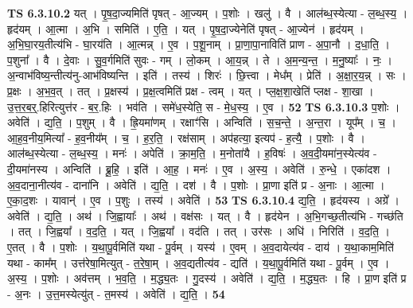 \documentclass[17pt]{extarticle}
\begin{document}
                  \newline
                                \textbf{ TS 6.3.10.2} \newline
                  यत् । पृ॒ष॒दा॒ज्यमिति॑ पृषत् - आ॒ज्यम् । प॒शोः । खलु॑ । वै । आल॑ब्ध॒स्येत्या - ल॒ब्ध॒स्य॒ । हृद॑यम् । आ॒त्मा । अ॒भि । समिति॑ । ए॒ति॒ । यत् । पृ॒ष॒दा॒ज्येनेति॑ पृषत् - आ॒ज्येन॑ । हृद॑यम् । अ॒भि॒घा॒रय॒तीत्य॑भि - घा॒रय॑ति । आ॒त्मन्न् । ए॒व । प॒शू॒नाम् । प्रा॒णा॒पा॒नाविति॑ प्राण - अ॒पा॒नौ । द॒धा॒ति॒ । प॒शुना᳚ । वै । दे॒वाः । सु॒व॒र्गमिति॑ सुवः - गम् । लो॒कम् । आ॒य॒न्न् । ते । अ॒म॒न्य॒न्त॒ । म॒नु॒ष्याः᳚ । नः॒ । अ॒न्वाभ॑विष्य॒न्तीत्य॑नु-आभ॑विष्यन्ति । इति॑ । तस्य॑ । शिरः॑ । छि॒त्त्वा । मेध᳚म् । प्रेति॑ । अ॒क्षा॒र॒य॒न्न् । सः । प्र॒क्षः । अ॒भ॒व॒त् । तत् । प्र॒क्षस्य॑ । प्र॒क्ष॒त्वमिति॑ प्रक्ष - त्वम् । यत् । प्ल॒क्ष॒शा॒खेति॑ प्लक्ष - शा॒खा । उ॒त्त॒र॒ब॒र्॒.हिरित्युत्त॑र - ब॒र॒.हिः । भव॑ति । समे॑ध॒स्येति॒ स - मे॒ध॒स्य॒ । ए॒व । \textbf{  52} \newline
                  \newline
                                \textbf{ TS 6.3.10.3} \newline
                  प॒शोः । अवेति॑ । द्य॒ति॒ । प॒शुम् । वै । ह्रि॒यमा॑णम् । रक्षाꣳ॑सि । अन्विति॑ । स॒च॒न्ते॒ । अ॒न्त॒रा । यूप᳚म् । च॒ । आ॒ह॒व॒नीय॒मित्या᳚ - ह॒व॒नीय᳚म् । च॒ । ह॒र॒ति॒ । रक्ष॑साम् । अप॑हत्या॒ इत्यप॑ - ह॒त्यै॒ । प॒शोः । वै । आल॑ब्ध॒स्येत्या - ल॒ब्ध॒स्य॒ । मनः॑ । अपेति॑ । क्रा॒म॒ति॒ । म॒नोता॑यै । ह॒विषः॑ । अ॒व॒दी॒यमा॑न॒स्येत्य॑व - दी॒यमा॑नस्य । अन्विति॑ । ब्रू॒हि॒ । इति॑ । आ॒ह॒ । मनः॑ । ए॒व । अ॒स्य॒ । अवेति॑ । रु॒न्धे॒ । एका॑दश । अ॒व॒दाना॒नीत्य॑व - दाना॑नि । अवेति॑ । द्य॒ति॒ । दश॑ । वै । प॒शोः । प्रा॒णा इति॑ प्र - अ॒नाः । आ॒त्मा । ए॒का॒द॒शः । यावान्॑ । ए॒व । प॒शुः । तस्य॑ । अवेति॑ । \textbf{  53} \newline
                  \newline
                                \textbf{ TS 6.3.10.4} \newline
                  द्य॒ति॒ । हृद॑यस्य । अग्रे᳚ । अवेति॑ । द्य॒ति॒ । अथ॑ । जि॒ह्वायाः᳚ । अथ॑ । वक्ष॑सः । यत् । वै । हृद॑येन । अ॒भि॒गच्छ॒तीत्य॑भि - गच्छ॑ति । तत् । जि॒ह्वया᳚ । व॒द॒ति॒ । यत् । जि॒ह्वया᳚ । वद॑ति । तत् । उर॑सः । अधि॑ । निरिति॑ । व॒द॒ति॒ । ए॒तत् । वै । प॒शोः । य॒था॒पू॒र्वमिति॑ यथा - पू॒र्वम् । यस्य॑ । ए॒वम् । अ॒व॒दायेत्य॑व - दाय॑ । य॒था॒काम॒मिति॑ यथा - काम᳚म् । उत्त॑रेषा॒मित्युत् - त॒रे॒षा॒म् । अ॒व॒द्यतीत्य॑व - द्यति॑ । य॒था॒पू॒र्वमिति॑ यथा - पू॒र्वम् । ए॒व । अ॒स्य॒ । प॒शोः । अव॑त्तम् । भ॒व॒ति॒ । म॒द्ध्य॒तः । गु॒दस्य॑ । अवेति॑ । द्य॒ति॒ । म॒द्ध्य॒तः । हि । प्रा॒ण इति॑ प्र - अ॒नः । उ॒त्त॒मस्येत्यु॑त् - त॒मस्य॑ । अवेति॑ । द्य॒ति॒ । \textbf{  54} \newline
\end{document}
